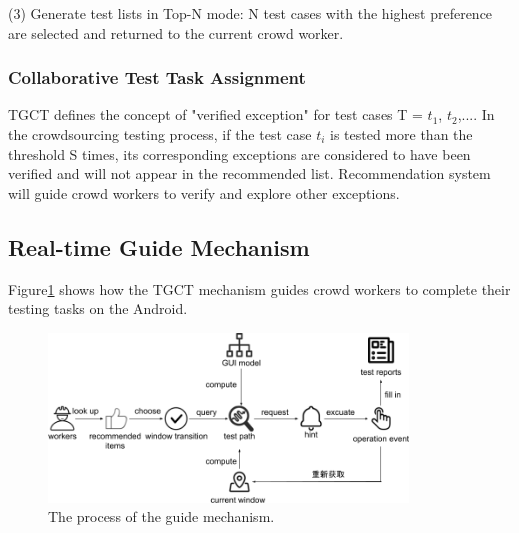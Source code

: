 (3) Generate test lists in Top-N mode: N test cases with the highest preference are selected and returned to the current crowd worker.%

\subsubsection{Collaborative Test Task Assignment}
TGCT defines the concept of "verified exception" for test cases T = {$t_{1}$, $t_{2}$,...}. In the crowdsourcing testing process, if the test case $t_{i}$ is tested more than the threshold S times, its corresponding exceptions are considered to have been verified and will not appear in the recommended list. Recommendation system will guide crowd workers to verify and explore other exceptions.%

\subsection{Real-time Guide Mechanism}
Figure\ref{fig:guide} shows how the TGCT mechanism guides crowd workers to complete their testing tasks on the Android.
\begin{figure}[htbp]
\centering
\centerline{\includegraphics[width=\columnwidth,height=4.5cm]{fig/10.png}}
\caption{The process of the guide mechanism.}
\label{fig:guide}
\end{figure}


